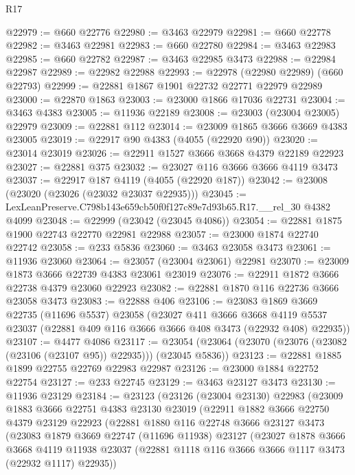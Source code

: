 \begin{lexlean}{R17}
\begin{coremodule}
@22979 := @660 @22776
@22980 := @3463 @22979
@22981 := @660 @22778
@22982 := @3463 @22981
@22983 := @660 @22780
@22984 := @3463 @22983
@22985 := @660 @22782
@22987 := @3463 @22985 @3473
@22988 := @22984 @22987
@22989 := @22982 @22988
@22993 := @22978 (@22980 @22989) (@660 @22793)
@22999 := @22881 @1867 @1901 @22732 @22771 @22979 @22989
@23000 := @22870 @1863
@23003 := @23000 @1866 @17036 @22731
@23004 := @3463 @4383
@23005 := @11936 @22189
@23008 := @23003 (@23004 @23005) @22979
@23009 := @22881 @112
@23014 := @23009 @1865 @3666 @3669 @4383 @23005
@23019 := @22917 @90 @4383 (@4055 (@22920 @90))
@23020 := @23014 @23019
@23026 := @22911 @1527 @3666 @3668 @4379 @22189 @22923
@23027 := @22881 @375
@23032 := @23027 @116 @3666 @3666 @4119 @3473
@23037 := @22917 @187 @4119 (@4055 (@22920 @187))
@23042 := @23008 (@23020 (@23026 (@23032 @23037 @22935)))
@23045 := LexLeanPreserve.C798b143e659cb50f0f127c89e7d93b65.R17.__rel_30 @4382 @4099
@23048 := @22999 (@23042 (@23045 @4086))
@23054 := @22881 @1875 @1900 @22743 @22770 @22981 @22988
@23057 := @23000 @1874 @22740 @22742
@23058 := @233 @5836
@23060 := @3463 @23058 @3473
@23061 := @11936 @23060
@23064 := @23057 (@23004 @23061) @22981
@23070 := @23009 @1873 @3666 @22739 @4383 @23061 @23019
@23076 := @22911 @1872 @3666 @22738 @4379 @23060 @22923
@23082 := @22881 @1870 @116 @22736 @3666 @23058 @3473
@23083 := @22888 @406
@23106 := @23083
    @1869
    @3669
    @22735
    (@11696 @5537)
    @23058
    (@23027
      @411
      @3666
      @3668
      @4119
      @5537
      @23037
      (@22881 @409 @116 @3666 @3666 @408 @3473 (@22932 @408) @22935))
@23107 := @4477 @4086
@23117 := @23054 (@23064 (@23070 (@23076 (@23082 (@23106 (@23107 @95)) @22935))) (@23045 @5836))
@23123 := @22881 @1885 @1899 @22755 @22769 @22983 @22987
@23126 := @23000 @1884 @22752 @22754
@23127 := @233 @22745
@23129 := @3463 @23127 @3473
@23130 := @11936 @23129
@23184 := @23123
    (@23126
      (@23004 @23130)
      @22983
      (@23009
        @1883
        @3666
        @22751
        @4383
        @23130
        @23019
        (@22911
          @1882
          @3666
          @22750
          @4379
          @23129
          @22923
          (@22881
            @1880
            @116
            @22748
            @3666
            @23127
            @3473
            (@23083
              @1879
              @3669
              @22747
              (@11696 @11938)
              @23127
              (@23027
                @1878
                @3666
                @3668
                @4119
                @11938
                @23037
                (@22881 @1118 @116 @3666 @3666 @1117 @3473 (@22932 @1117) @22935))

\end{coremodule}
\end{lexlean}
